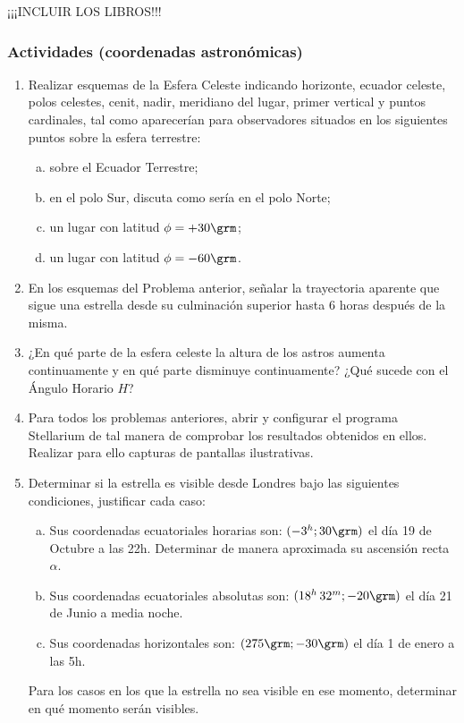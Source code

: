 ¡¡¡INCLUIR LOS LIBROS!!!

\subsubsection*{Actividades (coordenadas astronómicas)}
\small

\begin{enumerate}
  \item Realizar esquemas de la Esfera Celeste indicando horizonte, ecuador
    celeste, polos celestes, cenit, nadir, meridiano del lugar, primer vertical
    y puntos cardinales, tal como aparecerían para observadores situados en los
    siguientes puntos sobre la esfera terrestre:
    \begin{enumerate}[a)]
      \item sobre el Ecuador Terrestre;
      \item en el polo Sur, discuta como sería en el polo Norte;
      \item un lugar con latitud $\phi = + 30\grm$;
      \item un lugar con latitud \(\phi = - 60\grm\).
    \end{enumerate}

  \item En los esquemas del Problema anterior, señalar la trayectoria aparente
    que sigue una estrella desde su culminación superior hasta 6 horas después
    de la misma.

  \item ¿En qué parte de la esfera celeste la altura de los astros aumenta
    continuamente y en qué parte disminuye continuamente? ¿Qué sucede con el
    Ángulo Horario \(H\)?

  \item Para todos los problemas anteriores, abrir y configurar el programa
    Stellarium de tal manera de comprobar los resultados obtenidos en ellos.
    Realizar para ello capturas de pantallas ilustrativas.

  \item Determinar si la estrella es visible desde Londres bajo las siguientes
    condiciones, justificar cada caso:
    \begin{enumerate}[a)]
      \item Sus coordenadas ecuatoriales horarias son: \( (-3^h; 30\grm)\) el día
	19 de Octubre a las 22h. Determinar de manera aproximada su ascensión
	recta \(\alpha\).
      \item Sus coordenadas ecuatoriales absolutas son: \( (18^h\,32^m; -20\grm) \)
	el día 21 de Junio a media noche.
      \item Sus coordenadas horizontales son: \( (275\grm; -30\grm) \) el día 1 de
	enero a las 5h.
    \end{enumerate}
    Para los casos en los que la estrella no sea visible en ese momento,
    determinar en qué momento serán visibles.


\end{enumerate}
